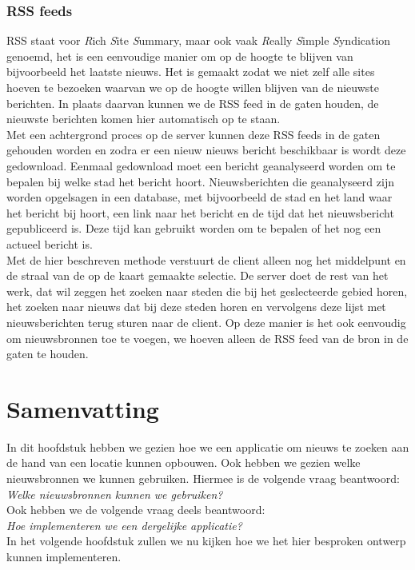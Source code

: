 \documentclass[twoside,openright]{uva-bachelor-thesis}
\begin{document}
		\subsubsection{RSS feeds}
			RSS staat voor \textit{R}ich \textit{S}ite \textit{S}ummary, maar ook vaak \textit{R}eally \textit{S}imple \textit{S}yndication genoemd, het is een eenvoudige manier om op de hoogte te blijven van bijvoorbeeld het laatste nieuws. Het is gemaakt zodat we niet zelf alle sites hoeven te bezoeken waarvan we op de hoogte willen blijven van de nieuwste berichten. In plaats daarvan kunnen we de RSS feed in de gaten houden, de nieuwste berichten komen hier automatisch op te staan.
			\\[0.5cm]
		Met een achtergrond proces op de server kunnen deze RSS feeds in de gaten gehouden worden en zodra er een nieuw nieuws bericht beschikbaar is wordt deze gedownload. Eenmaal gedownload moet een bericht geanalyseerd worden om te bepalen bij welke stad het bericht hoort. Nieuwsberichten die geanalyseerd zijn worden opgelsagen in een database, met bijvoorbeeld de stad en het land waar het bericht bij hoort, een link naar het bericht en de tijd dat het nieuwsbericht gepubliceerd is. Deze tijd kan gebruikt worden om te bepalen of het nog een actueel bericht is.
		\\[0.5cm]
		Met de hier beschreven methode verstuurt de client alleen nog het middelpunt en de straal van de op de kaart gemaakte selectie. De server doet de rest van het werk, dat wil zeggen het zoeken naar steden die bij het geslecteerde gebied horen, het zoeken naar nieuws dat bij deze steden horen en vervolgens deze lijst met nieuwsberichten terug sturen naar de client. Op deze manier is het ook eenvoudig om nieuwsbronnen toe te voegen, we hoeven alleen de RSS feed van de bron in de gaten te houden.
	\section{Samenvatting}
		In dit hoofdstuk hebben we gezien hoe we een applicatie om nieuws te zoeken aan de hand van een locatie kunnen opbouwen. Ook hebben we gezien welke nieuwsbronnen we kunnen gebruiken. Hiermee is de volgende vraag beantwoord:\\[0.5cm]	
		\indent \textit{Welke nieuwsbronnen kunnen we gebruiken?}\\[0.5cm]
		Ook hebben we de volgende vraag deels beantwoord:\\[0.5cm]
		\indent \textit{Hoe implementeren we een dergelijke applicatie?}\\[0.5cm]
		In het volgende hoofdstuk zullen we nu kijken hoe we het hier besproken ontwerp kunnen implementeren.
\end{document}
